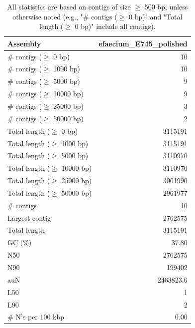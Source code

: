 \documentclass[12pt,a4paper]{article}
\begin{document}
\begin{table}[ht]
\begin{center}
\caption{All statistics are based on contigs of size $\geq$ 500 bp, unless otherwise noted (e.g., "\# contigs ($\geq$ 0 bp)" and "Total length ($\geq$ 0 bp)" include all contigs).}
\begin{tabular}{|l*{1}{|r}|}
\hline
Assembly & efaecium\_E745\_polished \\ \hline
\# contigs ($\geq$ 0 bp) & 10 \\ \hline
\# contigs ($\geq$ 1000 bp) & 10 \\ \hline
\# contigs ($\geq$ 5000 bp) & 9 \\ \hline
\# contigs ($\geq$ 10000 bp) & 9 \\ \hline
\# contigs ($\geq$ 25000 bp) & 3 \\ \hline
\# contigs ($\geq$ 50000 bp) & 2 \\ \hline
Total length ($\geq$ 0 bp) & 3115191 \\ \hline
Total length ($\geq$ 1000 bp) & 3115191 \\ \hline
Total length ($\geq$ 5000 bp) & 3110970 \\ \hline
Total length ($\geq$ 10000 bp) & 3110970 \\ \hline
Total length ($\geq$ 25000 bp) & 3001990 \\ \hline
Total length ($\geq$ 50000 bp) & 2961977 \\ \hline
\# contigs & 10 \\ \hline
Largest contig & 2762575 \\ \hline
Total length & 3115191 \\ \hline
GC (\%) & 37.80 \\ \hline
N50 & 2762575 \\ \hline
N90 & 199402 \\ \hline
auN & 2463823.6 \\ \hline
L50 & 1 \\ \hline
L90 & 2 \\ \hline
\# N's per 100 kbp & 0.00 \\ \hline
\end{tabular}
\end{center}
\end{table}
\end{document}
